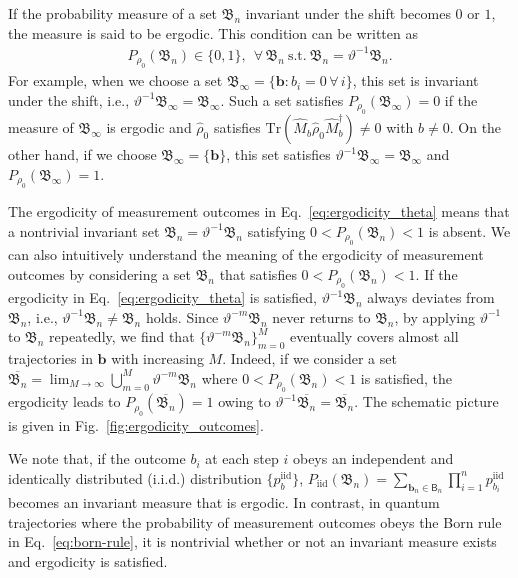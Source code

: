 \documentclass[preprint,pteplogo]{ptephy_v2}%
\numberwithin{equation}{section}
\theoremstyle{definition}
\begin{document}
If the probability measure of a set $\mathfrak{B}_n$ invariant under the shift becomes $0$ or $1$, the measure is said to be ergodic. 
This condition can be written as
\begin{align}
    P_{\rho_0}(\mathfrak{B}_n) \in \{ 0, 1 \},\ \ \forall \, \mathfrak{B}_n \ \mathrm{s.t.} \ \mathfrak{B}_n=\vartheta^{-1}\mathfrak{B}_n.
    \label{eq:ergodicity_theta}
\end{align}
For example, when we choose a set $\mathfrak{B}_\infty=\{\bm{b}:b_i=0\,\forall\,i\}$, this set is invariant under the shift, i.e., $\vartheta^{-1}\mathfrak{B}_\infty=\mathfrak{B}_\infty$. 
Such a set satisfies $P_{\rho_0}(\mathfrak{B}_\infty)=0$ if the measure of $\mathfrak{B}_\infty$ is ergodic and $\hat{\rho}_0$ satisfies $\mathrm{Tr}(\hat{M}_b\hat{\rho}_0\hat{M}_b^\dagger)\neq0$ with $b\neq0$. 
On the other hand, if we choose $\mathfrak{B}_\infty=\{\bm{b}\}$, this set satisfies $\vartheta^{-1}\mathfrak{B}_\infty=\mathfrak{B}_\infty$ and $P_{\rho_0}(\mathfrak{B}_\infty)=1$. 

The ergodicity of measurement outcomes in Eq.~\eqref{eq:ergodicity_theta} means that a nontrivial invariant set $\mathfrak{B}_n=\vartheta^{-1}\mathfrak{B}_n$ satisfying $0<P_{\rho_0}(\mathfrak{B}_n)<1$ is absent. 
We can also intuitively understand the meaning of the ergodicity of measurement outcomes by considering a set $\mathfrak{B}_n$ that satisfies $0 < P_{\rho_0}(\mathfrak{B}_n) < 1$. 
If the ergodicity in Eq.~\eqref{eq:ergodicity_theta} is satisfied, $\vartheta^{-1}\mathfrak{B}_n$ always deviates from $\mathfrak{B}_n$, i.e., $\vartheta^{-1}\mathfrak{B}_n\neq\mathfrak{B}_n$ holds. 
Since $\vartheta^{-m}\mathfrak{B}_n$ never returns to $\mathfrak{B}_n$, by applying $\vartheta^{-1}$ to $\mathfrak{B}_n$ repeatedly, we find that $\{\vartheta^{-m}\mathfrak{B}_n\}_{m=0}^M$ eventually covers almost all trajectories in $\bm{b}$ with increasing $M$. 
Indeed, if we consider a set $\overline{\mathfrak{B}_n}=\lim_{M\rightarrow\infty}\bigcup_{m=0}^M\vartheta^{-m}\mathfrak{B}_n$ where $0<P_{\rho_0}(\mathfrak{B}_n)<1$ is satisfied, the ergodicity leads to $P_{\rho_0}(\overline{\mathfrak{B}_n})=1$ owing to $\vartheta^{-1}\overline{\mathfrak{B}_n}=\overline{\mathfrak{B}_n}$. 
The schematic picture is given in Fig.~\ref{fig:ergodicity_outcomes}. 

We note that, if the outcome $b_i$ at each step $i$ obeys an independent and identically distributed (i.i.d.) distribution $\{p_b^\mathrm{iid}\}$, $P_\mathrm{iid}(\mathfrak{B}_n)=\sum_{\bm{b}_n \in \mathsf{B}_n}\prod_{i=1}^np_{b_i}^\mathrm{iid}$ becomes an invariant measure that is ergodic. 
In contrast, in quantum trajectories where the probability of measurement outcomes obeys the Born rule in Eq.~\eqref{eq:born-rule}, it is nontrivial whether or not an invariant measure exists and ergodicity is satisfied. 
\end{document}
